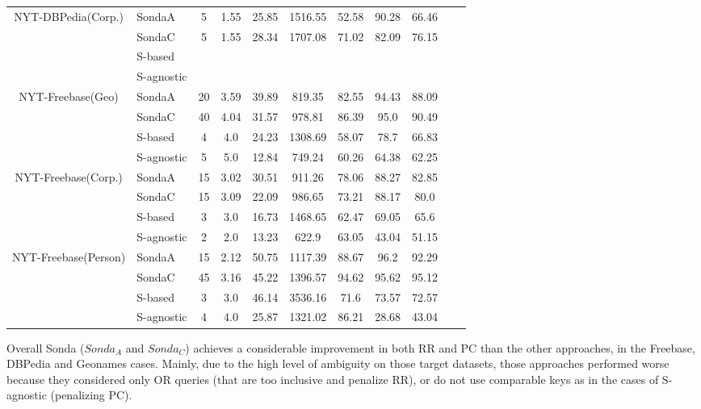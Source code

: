 \begin{center}
\begin{table*}[h]
\begin{tabular}{|c|l|c|c|c|c|c|c|c|c|c|}
\multirow{4}{*}{NYT-DBPedia(Corp.)} & SondaA     & 5 & 1.55   & 25.85  & 1516.55 & 52.58 & 90.28 & 66.46\\
											& SondaC    & 5 & 1.55   & 28.34  & 1707.08 & 71.02 & 82.09 & 76.15\\
											& S-based  \\
 											& S-agnostic       \\ \hline 		 		
 		
\multirow{4}{*}{NYT-Freebase(Geo)} & SondaA  & 20 & 3.59   & 39.89  & 819.35     & 82.55 & 94.43 & 88.09 \\
											& SondaC    & 40 & 4.04   & 31.57  & 978.81   & 86.39 & 95.0 & 90.49\\
											& S-based     & 4 & 4.0   & 24.23  & 1308.69   & 58.07 & 78.7 & 66.83\\
 											& S-agnostic    & 5 & 5.0   & 12.84  & 749.24    & 60.26 & 64.38 & 62.25   \\ \hline 											
 

\multirow{4}{*}{NYT-Freebase(Corp.)} & SondaA   & 15 & 3.02   & 30.51  & 911.26  & 78.06 & 88.27 & 82.85   \\
											 & SondaC   & 15 & 3.09   & 22.09  & 986.65  & 73.21 & 88.17 & 80.0\\
											& S-based     & 3 & 3.0   & 16.73  & 1468.65   & 62.47 & 69.05 & 65.6\\
 											& S-agnostic   & 2 & 2.0   & 13.23  & 622.9       & 63.05 & 43.04 & 51.15    \\ \hline 					
 											
\multirow{4}{*}{NYT-Freebase(Person)} & SondaA    & 15 & 2.12   & 50.75  & 1117.39   & 88.67 & 96.2 & 92.29\\
											& SondaC  &   45 & 3.16   & 45.22  & 1396.57  & 94.62 & 95.62 & 95.12\\
											& S-based       & 3 & 3.0   & 46.14  & 3536.16 &   71.6 & 73.57 & 72.57 \\
 											& S-agnostic    & 4 & 4.0   & 25.87  & 1321.02    & 86.21 & 28.68 & 43.04   \\ \hline 								

\end{tabular}  
\end{table*} 
\end{center}

Overall Sonda ($Sonda_A$ and $Sonda_C$) achieves a considerable improvement in both RR and PC than the other approaches, in the Freebase, DBPedia and Geonames cases. Mainly, due to the high level of ambiguity on those target datasets, those approaches performed worse because they considered only OR queries (that are too inclusive and penalize RR), or do not use comparable keys as in the cases of S-agnostic (penalizing PC).  

